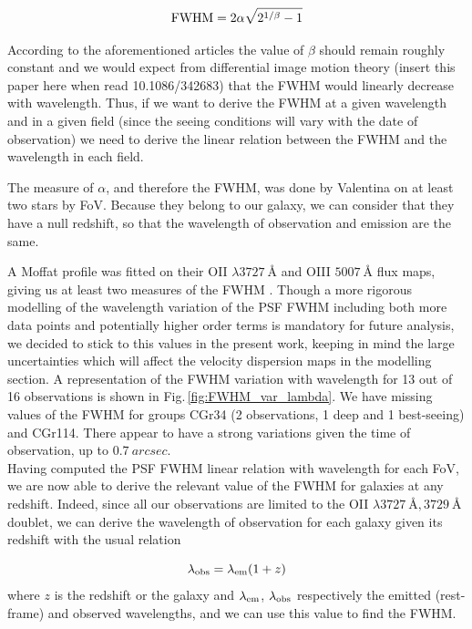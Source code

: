 \begin{equation}
	\rm{FWHM} = 2 \alpha \sqrt{2^{1/\beta} - 1 }
\end{equation}

According to the aforementioned articles the value of $\beta$ should remain roughly constant and we would expect from differential image motion theory (insert this paper here when read 10.1086/342683) that the FWHM  would linearly decrease with wavelength. Thus, if we want to derive the FWHM at a given wavelength and in a given field (since the seeing conditions will vary with the date of observation) we need to derive the linear relation between the FWHM and the wavelength in each field.

The measure of $\alpha$, and therefore the FWHM, was done by Valentina on at least two stars by FoV. Because they belong to our galaxy, we can consider that they have a null redshift, so that the wavelength of observation and emission are the same.

 A Moffat profile was fitted on their OII $\lambda \SI{3727}{\angstrom}$ and OIII $\SI{5007}{\angstrom}$ flux maps, giving us at least two measures of the FWHM . Though a more rigorous modelling of the wavelength variation of the PSF FWHM including both more data points and potentially higher order terms is mandatory for future analysis, we decided to stick to this values in the present work, keeping in mind the large uncertainties which will affect the velocity dispersion maps in the modelling section. A representation of the FWHM variation with wavelength for 13 out of 16 observations is shown in Fig.\,\ref{fig:FWHM_var_lambda}. We have missing values of the FWHM for groups CGr34 (2 observations, 1 deep and 1 best-seeing) and CGr114. There appear to have a strong variations given the time of observation, up to $\SI{0.7}{arcsec}$. \\
 
Having computed the PSF FWHM  linear relation with wavelength for each FoV, we are now able to derive the relevant value of the FWHM for galaxies at any redshift. Indeed, since all our observations are limited to the OII $\lambda \SI{3727}{\angstrom}, \SI{3729}{\angstrom}$ doublet, we can derive the wavelength of observation for each galaxy given its redshift with the usual relation

\begin{equation}
	\lambda_{\rm{obs}} = \lambda_{\rm{em}} ( 1 + z )
\end{equation}
where $z$ is the redshift or the galaxy and $\lambda_{\rm{em}}$, $\lambda_{\rm{obs}}$ respectively the emitted (rest-frame) and observed wavelengths, and we can use this value to find the FWHM.\\

